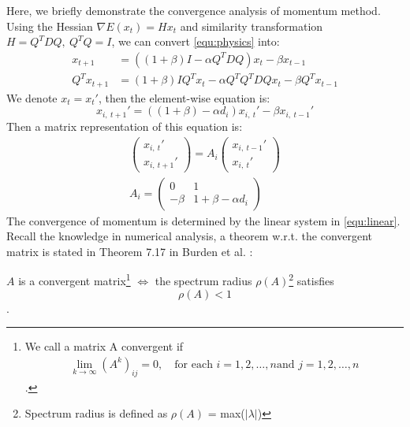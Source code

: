 Here, we briefly demonstrate the convergence analysis of momentum method.
Using the Hessian $ \nabla E(x_t) = Hx_t $ and similarity transformation 
$ H = Q^TDQ,\ Q^TQ = I $, we can convert \autoref{equ:physics} into: 
\begin{equation}
    \begin{split}
        x_{t+1} & = ((1 + \beta)I -\alpha Q^TDQ)x_t - \beta x_{t-1} \\
        Q^Tx_{t+1} & = (1 + \beta)IQ^Tx_t -\alpha Q^TQ^TDQx_t - \beta Q^Tx_{t-1}
    \end{split}
\end{equation}
We denote $ x_t = x_t' $, then the element-wise equation is:
\begin{equation}
    x_{i,\ t+1}' = ((1+\beta)-\alpha d_i)x_{i,\ t}' - \beta x_{i,\ t-1}'
\end{equation}
Then a matrix representation of this equation is:
\begin{equation}
    \label{equ:linear}
    \begin{split}
        \begin{pmatrix}
            x_{i,\ t}' \\
            x_{i,\ t+1}'
        \end{pmatrix}
        = A_i
        \begin{pmatrix}
            x_{i,\ t-1}'   \\
            x_{i,\ t}'
        \end{pmatrix} \\
        A_i = 
        \begin{pmatrix}
            0 & 1   \\
            -\beta & 1 + \beta - \alpha d_i
        \end{pmatrix}
    \end{split}
\end{equation}
The convergence of momentum is determined by the linear system
in \autoref{equ:linear}. Recall the knowledge in numerical
analysis, a theorem w.r.t. the convergent matrix is stated 
in Theorem 7.17 in Burden et al. \parencite{burden2010numerical}:
\begin{thm}
    $ A $ is a convergent matrix\footnote{We call a matrix A convergent if
    \begin{align}
        \lim _{k \rightarrow \infty}\left(A^{k}\right)_{i j}=0, \quad \text{for each } i=1,2, \ldots, n \text{and } j=1,2, \ldots, n
    \end{align}.}
    $\iff$ the spectrum radius $ \rho(A) $\footnote{Spectrum radius is 
    defined as $ \rho(A) $ = max($|\lambda|$)} 
    satisfies
    \begin{equation}
        \rho(A) < 1
    \end{equation}.
\end{thm}
